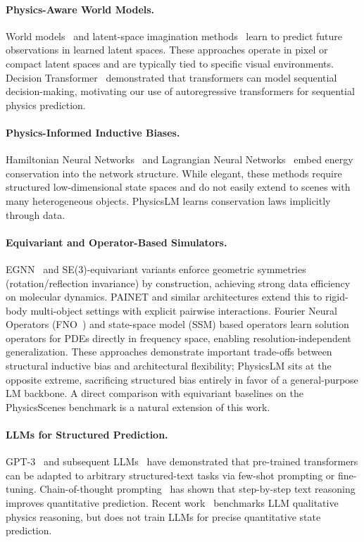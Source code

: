 \documentclass{article}
\begin{document}
\paragraph{Physics-Aware World Models.}
World models~\citep{ha2018world} and latent-space imagination methods~\citep{hafner2019dream}
learn to predict future observations in learned latent spaces. These approaches
operate in pixel or compact latent spaces and are typically tied to specific visual
environments. Decision Transformer~\citep{chen2021decision} demonstrated that
transformers can model sequential decision-making, motivating our use of
autoregressive transformers for sequential physics prediction.

\paragraph{Physics-Informed Inductive Biases.}
Hamiltonian Neural Networks~\citep{gregorova2019learned} and Lagrangian Neural
Networks~\citep{cranmer2020lagrangian} embed energy conservation into the network
structure. While elegant, these methods require structured low-dimensional state
spaces and do not easily extend to scenes with many heterogeneous objects. PhysicsLM
learns conservation laws implicitly through data.

\paragraph{Equivariant and Operator-Based Simulators.}
EGNN~\citep{satorras2021n} and SE(3)-equivariant variants enforce geometric symmetries
(rotation/reflection invariance) by construction, achieving strong data efficiency on
molecular dynamics. PAINET and similar architectures extend this to rigid-body
multi-object settings with explicit pairwise interactions. Fourier Neural Operators
(FNO~\citep{li2021fourier}) and state-space model (SSM) based operators learn
solution operators for PDEs directly in frequency space, enabling resolution-independent
generalization. These approaches demonstrate important trade-offs between structural
inductive bias and architectural flexibility; PhysicsLM sits at the opposite extreme,
sacrificing structured bias entirely in favor of a general-purpose LM backbone. A
direct comparison with equivariant baselines on the PhysicsScenes benchmark is
a natural extension of this work.

\paragraph{LLMs for Structured Prediction.}
GPT-3~\citep{brown2020language} and subsequent LLMs~\citep{touvron2023llama,
openai2023gpt4} have demonstrated that pre-trained transformers can be adapted to
arbitrary structured-text tasks via few-shot prompting or fine-tuning. Chain-of-thought
prompting~\citep{wei2022chain} has shown that step-by-step text reasoning improves
quantitative prediction. Recent work~\citep{yang2024physicslm} benchmarks LLM
qualitative physics reasoning, but does not train LLMs for precise quantitative
state prediction.
\end{document}
